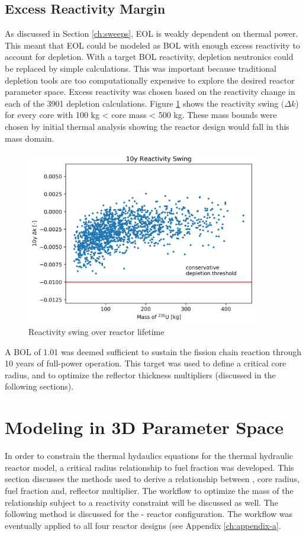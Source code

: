 \subsection{Excess Reactivity Margin}
As discussed in Section \ref{ch:sweeps}, EOL \keff is weakly dependent on
thermal power. This meant that EOL \keff could be modeled as BOL \keff with enough
excess reactivity to account for depletion. With a target BOL reactivity,
depletion neutronics could be replaced by simple \keff calculations. This
was important because traditional depletion tools are too computationally
expensive to explore the desired reactor parameter space. Excess reactivity was
chosen based on the reactivity change in each of the 3901 depletion calculations. Figure
\ref{fig:delta_k_eol} shows the reactivity swing $(\Delta k$) for every core
with 100 kg < core mass < 500 kg. These mass bounds were chosen by initial thermal analysis
showing the reactor design would fall in this mass domain.

\begin{figure}[h]
    \centering
    \includegraphics[width=4in]{../images/dK_vs_mass.png}
\caption{Reactivity swing over reactor lifetime}
\label{fig:delta_k_eol}
\end{figure}

A BOL \keff of 1.01 was deemed sufficient to sustain the fission chain reaction
through 10 years of full-power operation. This \keff target was used to define a
critical core radius, and to optimize the reflector thickness multipliers
(discussed in the following sections).

\section{Modeling \keff in 3D Parameter Space}\label{sec:crit_model}
In order to constrain the thermal hydaulics equations for the 
thermal hydraulic reactor model, a critical radius relationship to fuel fraction was developed. 
This section discusses the methods used to derive a relationship between \keff,
core radius, fuel fraction and, reflector multiplier. The workflow to
optimize the mass of the \keff relationship subject to a reactivity constraint
will be discussed as well. The following method is discussed for the \uox-\codiox
reactor configuration. The workflow was eventually applied to all four reactor
designs (see Appendix \ref{ch:appendix-a}.

